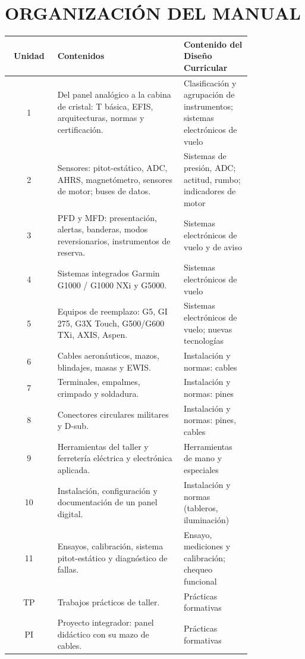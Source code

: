 \section*{ORGANIZACIÓN DEL MANUAL}

\begin{center}
\small
\begin{tabular}{|c|>{\raggedright\arraybackslash}p{0.52\linewidth}|>{\raggedright\arraybackslash}p{0.29\linewidth}|}
\hline
\textbf{Unidad} & \textbf{Contenidos} & \textbf{Contenido del Diseño Curricular} \\ \hline
1 & Del panel analógico a la cabina de cristal: T básica, EFIS, arquitecturas, normas y
certificación. & Clasificación y agrupación de instrumentos; sistemas electrónicos de vuelo \\
\hline
2 & Sensores: pitot-estático, ADC, AHRS, magnetómetro, sensores de motor; buses de datos. & Sistemas
de presión, ADC; actitud, rumbo; indicadores de motor \\ \hline
3 & PFD y MFD: presentación, alertas, banderas, modos reversionarios, instrumentos de reserva. &
Sistemas electrónicos de vuelo y de aviso \\ \hline
4 & Sistemas integrados Garmin G1000 / G1000 NXi y G5000. & Sistemas electrónicos de vuelo \\ \hline
5 & Equipos de reemplazo: G5, GI 275, G3X Touch, G500/G600 TXi, AXIS, Aspen. & Sistemas
electrónicos de vuelo; nuevas tecnologías \\ \hline
6 & Cables aeronáuticos, mazos, blindajes, masas y EWIS. & Instalación y normas: cables \\ \hline
7 & Terminales, empalmes, crimpado y soldadura. & Instalación y normas: pines \\ \hline
8 & Conectores circulares militares y D-sub. & Instalación y normas: pines, cables \\ \hline
9 & Herramientas del taller y ferretería eléctrica y electrónica aplicada. & Herramientas de mano y
especiales \\ \hline
10 & Instalación, configuración y documentación de un panel digital. & Instalación y normas
(tableros, iluminación) \\ \hline
11 & Ensayos, calibración, sistema pitot-estático y diagnóstico de fallas. & Ensayo, mediciones y
calibración; chequeo funcional \\ \hline
TP & Trabajos prácticos de taller. & Prácticas formativas \\ \hline
PI & Proyecto integrador: panel didáctico con su mazo de cables. & Prácticas formativas \\ \hline
\end{tabular}
\end{center}

